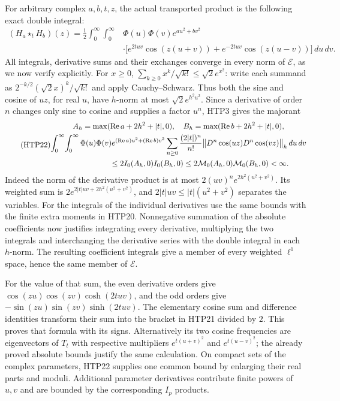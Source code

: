 For arbitrary complex $a,b,t,z$, the actual transported
product is the following exact double integral:
\begin{equation}\tag{HTP21}
\boxed{\begin{aligned}
 (H_a\star_tH_b)(z)
  =\frac12\int_0^\infty\!\int_0^\infty
       &\Phi(u)\Phi(v)e^{au^2+bv^2}\\[-2pt]
       &\cdot\bigl[e^{2tuv}\cos(z(u+v))
                    +e^{-2tuv}\cos(z(u-v))\bigr]\,du\,dv.
\end{aligned}}
\end{equation}
All integrals, derivative sums and their exchanges converge
in every norm of $\mathcal E$, as we now verify explicitly.
For $x\ge0$,
$\sum_{k\ge0}x^k/\sqrt{k!}\le\sqrt2e^{x^2}$:
write each summand as
$2^{-k/2}(\sqrt2x)^k/\sqrt{k!}$ and apply Cauchy--Schwarz.
Thus both the sine and cosine of $uz$, for real $u$, have
$h$-norm at most $\sqrt2e^{h^2u^2}$.
Since a derivative of order $n$ changes only sine to cosine
and supplies a factor $u^n$, HTP3 gives the majorant
\begin{equation}\tag{HTP22}
\begin{gathered}
 A_h=\max(\operatorname{Re}a+2h^2+|t|,0),\quad
 B_h=\max(\operatorname{Re}b+2h^2+|t|,0),\\
 \int_0^\infty\!\int_0^\infty
 \Phi(u)\Phi(v)e^{(\operatorname{Re}a)u^2+(\operatorname{Re}b)v^2}
 \sum_{n\ge0}\frac{(2|t|)^n}{n!}
 \bigl\|D^n\cos(uz)D^n\cos(vz)\bigr\|_h\,du\,dv\\
 \hspace{20mm}\le2I_0(A_h,0)I_0(B_h,0)
       \le2\mathcal M_0(A_h,0)\mathcal M_0(B_h,0)<\infty.
\end{gathered}
\end{equation}
Indeed the norm of the derivative product is at most
$2(uv)^ne^{2h^2(u^2+v^2)}$. Its weighted sum is
$2e^{2|t|uv+2h^2(u^2+v^2)}$, and
$2|t|uv\le|t|(u^2+v^2)$ separates the variables.
For the integrals of the individual derivatives use the
same bounds with the finite extra moments in HTP20.
Nonnegative summation of the absolute coefficients now
justifies integrating every derivative, multiplying the
two integrals and interchanging the derivative series with
the double integral in each $h$-norm. The resulting
coefficient integrals give a member of every weighted
$\ell^1$ space, hence the same member of $\mathcal E$.

For the value of that sum, the even derivative orders give
$\cos(zu)\cos(zv)\cosh(2tuv)$, and the odd orders give
$-\sin(zu)\sin(zv)\sinh(2tuv)$. The elementary cosine sum
and difference identities transform their sum into the
bracket in HTP21 divided by $2$. This proves that formula
with its signs. Alternatively its two cosine frequencies
are eigenvectors of $T_t$ with respective multipliers
$e^{t(u+v)^2}$ and $e^{t(u-v)^2}$; the already proved
absolute bounds justify the same calculation. On compact
sets of the complex parameters, HTP22 supplies one common
bound by enlarging their real parts and moduli. Additional
parameter derivatives contribute finite powers of $u,v$
and are bounded by the corresponding $I_p$ products.

